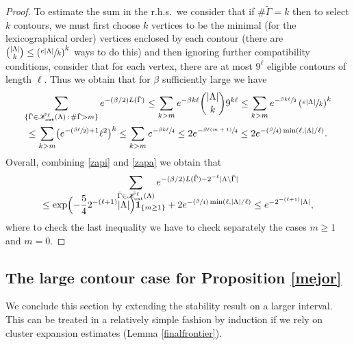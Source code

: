 \documentclass[10pt]{amsart}
\let\mathcal\mathscr
\newcommand{\sep}{\,:\,}
\newcommand{\Psfrac}[2]{(\sfrac{#1}{#2})}
\numberwithin{equation}{section}
\theoremstyle{plain}
\theoremstyle{definition}
\newcommand{\ext}{\mathrm{ext}}
\newcommand{\ind}{\mathbf{1}}
\newcommand{\cK}{{\ensuremath{\mathcal K}} }
\newcommand{\gb}{\beta}
\newcommand{\gG}{\Gamma}
\newcommand{\gL}{\Lambda}
\begin{document}
\begin{proof}
To estimate the sum in the r.h.s.\, we consider that if $\# \tilde \gG=k$ then to select $k$ contours, we must first choose
$k$ vertices to be the minimal (for the lexicographical order) vertices enclosed by each contour
(there are $\binom{|\gL|}{k}\le \left(\sfrac{e |\gL|}{k}\right)^k$ ways to do this)
and then ignoring further compatibility conditions, consider that for each vertex, there are at most $9^{\ell}$ eligible contours of length $\ell$.
Thus we obtain that for $\gb$ sufficiently large we have
\begin{multline} \label{zapa}
\sum_{\{ \tilde \gG\in \tilde \cK^{\ell}_{\ext}(\gL)\sep \# \tilde \gG > m \}} e^{-(\gb/2) L(\tilde\gG)}\le
\sum_{k> m} e^{-\gb k\ell} \binom{|\gL|}{k} 9^{k\ell}
\le \sum_{k> m} e^{-\sfrac{\gb k\ell}{2}} \left(\sfrac{e |\gL|}{k}\right)^k\\
\le \sum_{k> m}\bigl(e^{-\Psfrac{\gb \ell}{2}+1} \ell^2 \bigr)^k
\le \sum_{k> m} e^{-\sfrac{\gb k\ell}{4}}\le 2 e^{-\sfrac{\gb \ell(m+1)}{4}} \le 2e^{-\Psfrac{\gb}{4}\min \left(\ell, |\gL|/\ell \right)}.
\end{multline}
Overall, combining \eqref{zapi} and \eqref{zapa} we obtain that
\begin{multline*}
\sum_{\tilde \gG\in \tilde \cK^{\ell}_{\ext}(\gL)}e^{-(\gb/2) L(\tilde\gG)-2^{-\ell} |\gL\setminus \bar \gG|}\\[-10pt]
\le
\exp\Bigl(-\frac{5}{4}2^{-(\ell+1)} |\gL|\Bigr)\ind_{\{m\ge 1\}}
+ 2e^{-\Psfrac{\gb}{4}\min \left(\ell, |\gL|/\ell \right)} \le e^{-2^{-(\ell+1)} |\gL|},
\end{multline*}
where to check the last inequality we have to check separately the cases $m\ge 1$ and $m=0$.
\end{proof}

\subsection{The large contour case for Proposition \ref{mejor}}\label{mejorplus}

We conclude this section by extending the stability result on a larger interval.
This can be treated in a relatively simple fashion by induction if we rely on cluster expansion estimates (Lemma \ref{finalfrontier}).
\end{document}
